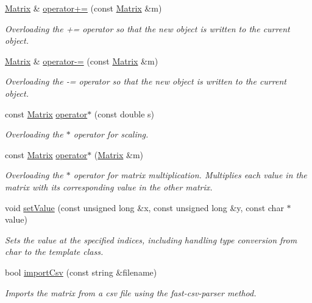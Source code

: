 \begin{DoxyCompactItemize}
\hyperlink{class_matrix}{Matrix} \& \hyperlink{class_matrix_a480a72298ae1fc8443b0edfaa66d7c46}{operator+=} (const \hyperlink{class_matrix}{Matrix} \&m)
\begin{DoxyCompactList}\small\item\em Overloading the += operator so that the new object is written to the current object. \end{DoxyCompactList}\item 
\hyperlink{class_matrix}{Matrix} \& \hyperlink{class_matrix_a0e459fd035b2435ea016dc93c55ccac0}{operator-\/=} (const \hyperlink{class_matrix}{Matrix} \&m)
\begin{DoxyCompactList}\small\item\em Overloading the -\/= operator so that the new object is written to the current object. \end{DoxyCompactList}\item 
const \hyperlink{class_matrix}{Matrix} \hyperlink{class_matrix_ac4e94b307c56a15fb47a9255855f94a9}{operator$\ast$} (const double s)
\begin{DoxyCompactList}\small\item\em Overloading the $\ast$ operator for scaling. \end{DoxyCompactList}\item 
const \hyperlink{class_matrix}{Matrix} \hyperlink{class_matrix_ac396cdd2d98e1b4d99f7e17c1c26b1ec}{operator$\ast$} (\hyperlink{class_matrix}{Matrix} \&m)
\begin{DoxyCompactList}\small\item\em Overloading the $\ast$ operator for matrix multiplication. Multiplies each value in the matrix with its corresponding value in the other matrix. \end{DoxyCompactList}\item 
void \hyperlink{class_matrix_ae511e2f5874e7602fc968541efeefca1}{set\+Value} (const unsigned long \&x, const unsigned long \&y, const char $\ast$value)
\begin{DoxyCompactList}\small\item\em Sets the value at the specified indices, including handling type conversion from char to the template class. \end{DoxyCompactList}\item 
bool \hyperlink{class_matrix_a0a5d9135e9807b81ddc3cf05e777a902}{import\+Csv} (const string \&filename)
\begin{DoxyCompactList}\small\item\em Imports the matrix from a csv file using the fast-\/csv-\/parser method. \end{DoxyCompactList}\end{DoxyCompactItemize}
